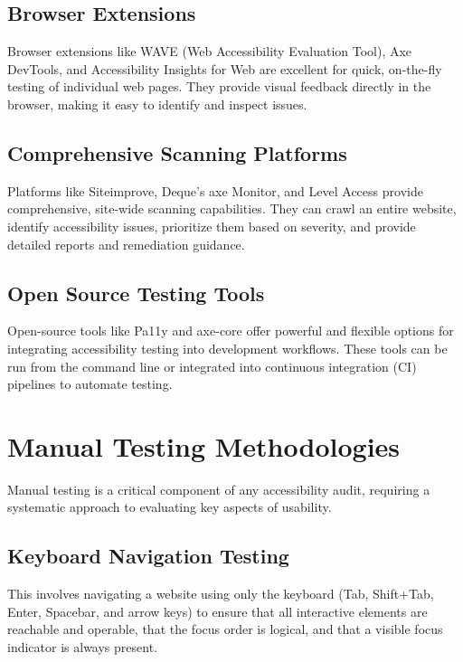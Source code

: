 \subsection{Browser Extensions}
\label{subsec:browser-extensions}
Browser extensions like WAVE (Web Accessibility Evaluation Tool), Axe DevTools, and Accessibility Insights for Web are excellent for quick, on-the-fly testing of individual web pages. They provide visual feedback directly in the browser, making it easy to identify and inspect issues.
\supercite{WebAIMWave, DequeAxeDevTools, MicrosoftInsights}

\subsection{Comprehensive Scanning Platforms}
\label{subsec:scanning-platforms}
Platforms like Siteimprove, Deque's axe Monitor, and Level Access provide comprehensive, site-wide scanning capabilities. They can crawl an entire website, identify accessibility issues, prioritize them based on severity, and provide detailed reports and remediation guidance.
\supercite{SiteimproveAccessibility, DequeWorldSpace, AudioEyeTesting}

\subsection{Open Source Testing Tools}
\label{subsec:open-source-tools}
Open-source tools like Pa11y and axe-core offer powerful and flexible options for integrating accessibility testing into development workflows. These tools can be run from the command line or integrated into continuous integration (CI) pipelines to automate testing.
\supercite{Pa11y, Lighthouse, DequeAxeCore}

\section{Manual Testing Methodologies}
\label{sec:manual-methodologies}
Manual testing is a critical component of any \gls{accessibility} audit, requiring a systematic approach to evaluating key aspects of usability.

\subsection{Keyboard Navigation Testing}
\label{subsec:keyboard-testing}
This involves navigating a website using only the keyboard (Tab, Shift+Tab, Enter, Spacebar, and arrow keys) to ensure that all interactive elements are reachable and operable, that the focus order is logical, and that a visible focus indicator is always present.
\supercite{WebAIMKeyboardA11y}

